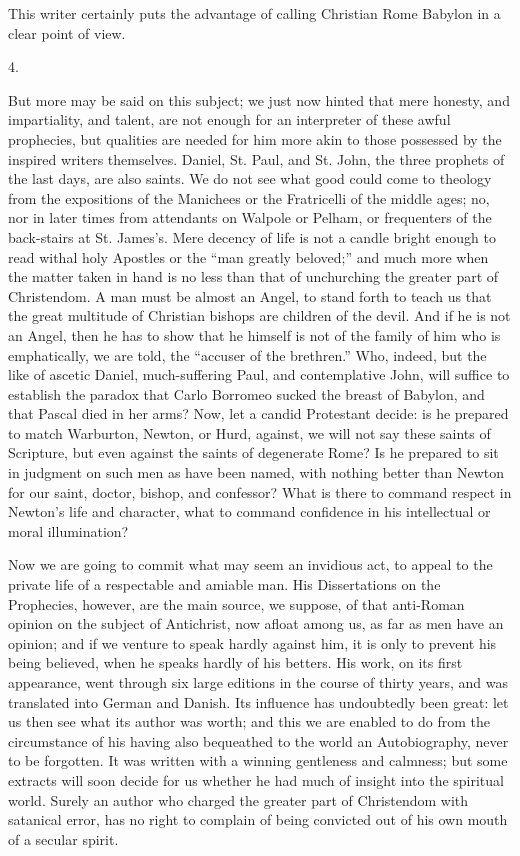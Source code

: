 This writer certainly puts the advantage of calling Christian Rome
Babylon in a clear point of view.

4.

But more may be said on this subject; we just now hinted that mere
honesty, and impartiality, and talent, are not enough for an
interpreter of these awful prophecies, but qualities are needed for
him more akin to those possessed by the inspired writers
themselves. Daniel, St. Paul, and St. John, the three prophets of the
last days, are also saints. We do not see what good could come to
theology from the expositions of the Manichees or the Fratricelli of
the middle ages; no, nor in later times from attendants on Walpole or
Pelham, or frequenters of the back-stairs at St. James's. Mere decency
of life is not a candle bright enough to read withal holy Apostles or
the ``man greatly beloved;'' and much more when the matter
taken in hand is no less than that of unchurching the greater part of
Christendom. A man must be almost an Angel, to stand forth to teach us
that the great multitude of Christian bishops are children of the
devil. And if he is not an Angel, then he has to show that he himself
is not of the family of him who is emphatically, we are told, the
``accuser of the brethren.'' Who, indeed, but the like of
ascetic Daniel, much-suffering Paul, and contemplative John, will
suffice to establish the paradox that Carlo Borromeo sucked the breast
of Babylon, and that Pascal died in her arms? Now, let a candid
Protestant decide: is he prepared to match Warburton, Newton, or Hurd,
against, we will not say these saints of Scripture, but even against
the saints of degenerate Rome? Is he prepared to sit in judgment on
such men as have been named, with nothing better than Newton for our
saint, doctor, bishop, and confessor? What is there to command respect
in Newton's life and character, what to command confidence in his
intellectual or moral illumination?

Now we are going to commit what may seem an invidious act, to
appeal to the private life of a respectable and amiable man. His
Dissertations on the Prophecies, however, are the main source, we
suppose, of that anti-Roman opinion on the subject of Antichrist, now
afloat among us, as far as men have an opinion; and if we
venture to speak hardly against him, it is only to prevent his being
believed, when he speaks hardly of his betters. His work, on its first
appearance, went through six large editions in the course of thirty
years, and was translated into German and Danish. Its influence has
undoubtedly been great: let us then see what its author was worth; and
this we are enabled to do from the circumstance of his having also
bequeathed to the world an Autobiography, never to be forgotten. It
was written with a winning gentleness and calmness; but some extracts
will soon decide for us whether he had much of insight into the
spiritual world. Surely an author who charged the greater part of
Christendom with satanical error, has no right to complain of being
convicted out of his own mouth of a secular spirit.

